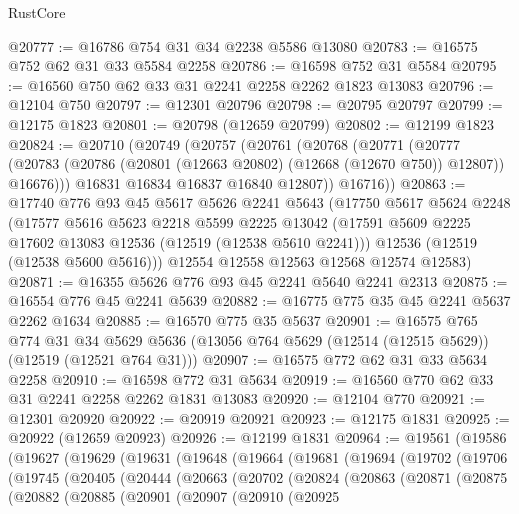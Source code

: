 \begin{lexlean}{RustCore}
\begin{coremodule}
@20777 := @16786 @754 @31 @34 @2238 @5586 @13080
@20783 := @16575 @752 @62 @31 @33 @5584 @2258
@20786 := @16598 @752 @31 @5584
@20795 := @16560 @750 @62 @33 @31 @2241 @2258 @2262 @1823 @13083
@20796 := @12104 @750
@20797 := @12301 @20796
@20798 := @20795 @20797
@20799 := @12175 @1823
@20801 := @20798 (@12659 @20799)
@20802 := @12199 @1823
@20824 := @20710
    (@20749
      (@20757
        (@20761
          (@20768
            (@20771
              (@20777
                (@20783 (@20786 (@20801 (@12663 @20802) (@12668 (@12670 @750)) @12807)) @16676)))
            @16831
            @16834
            @16837
            @16840
            @12807))
        @16716))
@20863 := @17740
    @776
    @93
    @45
    @5617
    @5626
    @2241
    @5643
    (@17750
      @5617
      @5624
      @2248
      (@17577
        @5616
        @5623
        @2218
        @5599
        @2225
        @13042
        (@17591 @5609 @2225 @17602 @13083 @12536 (@12519 (@12538 @5610 @2241)))
        @12536
        (@12519 (@12538 @5600 @5616)))
      @12554
      @12558
      @12563
      @12568
      @12574
      @12583)
@20871 := @16355 @5626 @776 @93 @45 @2241 @5640 @2241 @2313
@20875 := @16554 @776 @45 @2241 @5639
@20882 := @16775 @775 @35 @45 @2241 @5637 @2262 @1634
@20885 := @16570 @775 @35 @5637
@20901 := @16575
    @765
    @774
    @31
    @34
    @5629
    @5636
    (@13056 @764 @5629 (@12514 (@12515 @5629)) (@12519 (@12521 @764 @31)))
@20907 := @16575 @772 @62 @31 @33 @5634 @2258
@20910 := @16598 @772 @31 @5634
@20919 := @16560 @770 @62 @33 @31 @2241 @2258 @2262 @1831 @13083
@20920 := @12104 @770
@20921 := @12301 @20920
@20922 := @20919 @20921
@20923 := @12175 @1831
@20925 := @20922 (@12659 @20923)
@20926 := @12199 @1831
@20964 := @19561
    (@19586
      (@19627
        (@19629
          (@19631
            (@19648
              (@19664
                (@19681
                  (@19694
                    (@19702
                      (@19706
                        (@19745
                          (@20405
                            (@20444
                              (@20663
                                (@20702
                                  (@20824
                                    (@20863
                                      (@20871
                                        (@20875
                                          (@20882
                                            (@20885
                                              (@20901
                                                (@20907
                                                  (@20910
                                                    (@20925

\end{coremodule}
\end{lexlean}
